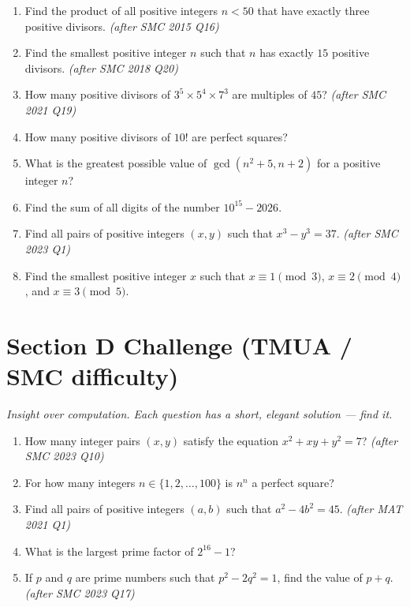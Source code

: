 \documentclass[11pt,a4paper]{article}
\begin{document}
\begin{enumerate}

\item Find the product of all positive integers $n < 50$ that have exactly three positive divisors. \textit{\small(after SMC 2015 Q16)}

\item Find the smallest positive integer $n$ such that $n$ has exactly $15$ positive divisors. \textit{\small(after SMC 2018 Q20)}

\item How many positive divisors of $3^5 \times 5^4 \times 7^3$ are multiples of $45$? \textit{\small(after SMC 2021 Q19)}

\item How many positive divisors of $10!$ are perfect squares?

\item What is the greatest possible value of $\gcd(n^2 + 5, n + 2)$ for a positive integer $n$?

\item Find the sum of all digits of the number $10^{15} - 2026$.

\item Find all pairs of positive integers $(x,y)$ such that $x^3 - y^3 = 37$. \textit{\small(after SMC 2023 Q1)}

\item Find the smallest positive integer $x$ such that $x \equiv 1 \pmod 3$, $x \equiv 2 \pmod 4$, and $x \equiv 3 \pmod 5$.

\end{enumerate}

\section*{Section D \quad Challenge \hfill{\normalfont\small(TMUA / SMC difficulty)}}

\noindent\textit{Insight over computation. Each question has a short, elegant solution --- find it.}

\begin{enumerate}

\item How many integer pairs $(x,y)$ satisfy the equation $x^2 + xy + y^2 = 7$? \textit{\small(after SMC 2023 Q10)}

\item For how many integers $n \in \{1, 2, \dots, 100\}$ is $n^n$ a perfect square?

\item Find all pairs of positive integers $(a,b)$ such that $a^2 - 4b^2 = 45$. \textit{\small(after MAT 2021 Q1)}

\item What is the largest prime factor of $2^{16} - 1$?

\item If $p$ and $q$ are prime numbers such that $p^2 - 2q^2 = 1$, find the value of $p+q$. \textit{\small(after SMC 2023 Q17)}

\end{enumerate}

\end{document}
